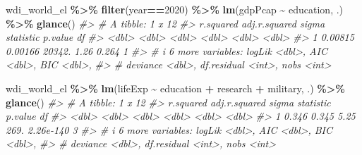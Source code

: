 \documentclass[
  xelatex, ja=standard]{bxjsbook}
\newenvironment{Shaded}{\begin{snugshade}}{\end{snugshade}}
\newcommand{\CommentTok}[1]{\textcolor[rgb]{0.56,0.35,0.01}{\textit{#1}}}
\newcommand{\DecValTok}[1]{\textcolor[rgb]{0.00,0.00,0.81}{#1}}
\newcommand{\FunctionTok}[1]{\textcolor[rgb]{0.13,0.29,0.53}{\textbf{#1}}}
\newcommand{\NormalTok}[1]{#1}
\newcommand{\SpecialCharTok}[1]{\textcolor[rgb]{0.81,0.36,0.00}{\textbf{#1}}}
\theoremstyle{definition}
\theoremstyle{definition}
\theoremstyle{definition}
\theoremstyle{definition}
\theoremstyle{remark}
\begin{document}
\begin{Shaded}
\begin{Highlighting}[]
\NormalTok{wdi\_world\_el }\SpecialCharTok{\%\textgreater{}\%} \FunctionTok{filter}\NormalTok{(year}\SpecialCharTok{==}\DecValTok{2020}\NormalTok{) }\SpecialCharTok{\%\textgreater{}\%} \FunctionTok{lm}\NormalTok{(gdpPcap }\SpecialCharTok{\textasciitilde{}}\NormalTok{ education, .) }\SpecialCharTok{\%\textgreater{}\%} \FunctionTok{glance}\NormalTok{()}
\CommentTok{\#\textgreater{} \# A tibble: 1 x 12}
\CommentTok{\#\textgreater{}   r.squared adj.r.squared  sigma statistic p.value    df}
\CommentTok{\#\textgreater{}       \textless{}dbl\textgreater{}         \textless{}dbl\textgreater{}  \textless{}dbl\textgreater{}     \textless{}dbl\textgreater{}   \textless{}dbl\textgreater{} \textless{}dbl\textgreater{}}
\CommentTok{\#\textgreater{} 1   0.00815       0.00166 20342.      1.26   0.264     1}
\CommentTok{\#\textgreater{} \# i 6 more variables: logLik \textless{}dbl\textgreater{}, AIC \textless{}dbl\textgreater{}, BIC \textless{}dbl\textgreater{},}
\CommentTok{\#\textgreater{} \#   deviance \textless{}dbl\textgreater{}, df.residual \textless{}int\textgreater{}, nobs \textless{}int\textgreater{}}
\end{Highlighting}
\end{Shaded}

\begin{Shaded}
\begin{Highlighting}[]
\NormalTok{wdi\_world\_el }\SpecialCharTok{\%\textgreater{}\%} \FunctionTok{lm}\NormalTok{(lifeExp }\SpecialCharTok{\textasciitilde{}}\NormalTok{ education }\SpecialCharTok{+}\NormalTok{ research }\SpecialCharTok{+}\NormalTok{ military, .) }\SpecialCharTok{\%\textgreater{}\%} \FunctionTok{glance}\NormalTok{()}
\CommentTok{\#\textgreater{} \# A tibble: 1 x 12}
\CommentTok{\#\textgreater{}   r.squared adj.r.squared sigma statistic   p.value    df}
\CommentTok{\#\textgreater{}       \textless{}dbl\textgreater{}         \textless{}dbl\textgreater{} \textless{}dbl\textgreater{}     \textless{}dbl\textgreater{}     \textless{}dbl\textgreater{} \textless{}dbl\textgreater{}}
\CommentTok{\#\textgreater{} 1     0.346         0.345  5.25      269. 2.26e{-}140     3}
\CommentTok{\#\textgreater{} \# i 6 more variables: logLik \textless{}dbl\textgreater{}, AIC \textless{}dbl\textgreater{}, BIC \textless{}dbl\textgreater{},}
\CommentTok{\#\textgreater{} \#   deviance \textless{}dbl\textgreater{}, df.residual \textless{}int\textgreater{}, nobs \textless{}int\textgreater{}}
\end{Highlighting}
\end{Shaded}
\end{document}

